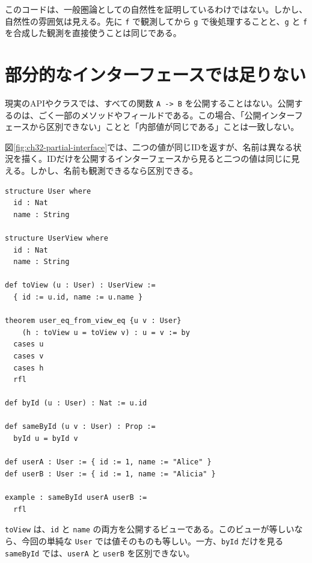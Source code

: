このコードは、一般圏論としての自然性を証明しているわけではない。しかし、自然性の雰囲気は見える。先に \texttt{f} で観測してから \texttt{g} で後処理することと、\texttt{g} と \texttt{f} を合成した観測を直接使うことは同じである。

\section{部分的なインターフェースでは足りない}

現実のAPIやクラスでは、すべての関数 \texttt{A -> B} を公開することはない。公開するのは、ごく一部のメソッドやフィールドである。この場合、「公開インターフェースから区別できない」ことと「内部値が同じである」ことは一致しない。


図\ref{fig:ch32-partial-interface}では、二つの値が同じIDを返すが、名前は異なる状況を描く。IDだけを公開するインターフェースから見ると二つの値は同じに見える。しかし、名前も観測できるなら区別できる。

\begin{listing}[htbp]
\begin{verbatim}
structure User where
  id : Nat
  name : String

structure UserView where
  id : Nat
  name : String

def toView (u : User) : UserView :=
  { id := u.id, name := u.name }

theorem user_eq_from_view_eq {u v : User}
    (h : toView u = toView v) : u = v := by
  cases u
  cases v
  cases h
  rfl

def byId (u : User) : Nat := u.id

def sameById (u v : User) : Prop :=
  byId u = byId v

def userA : User := { id := 1, name := "Alice" }
def userB : User := { id := 1, name := "Alicia" }

example : sameById userA userB :=
  rfl
\end{verbatim}
\caption{IDだけの観測ではユーザー全体は決まらない}
\label{lst:ch32_partial_observer}
\end{listing}

\texttt{toView} は、\texttt{id} と \texttt{name} の両方を公開するビューである。このビューが等しいなら、今回の単純な \texttt{User} では値そのものも等しい。一方、\texttt{byId} だけを見る \texttt{sameById} では、\texttt{userA} と \texttt{userB} を区別できない。


